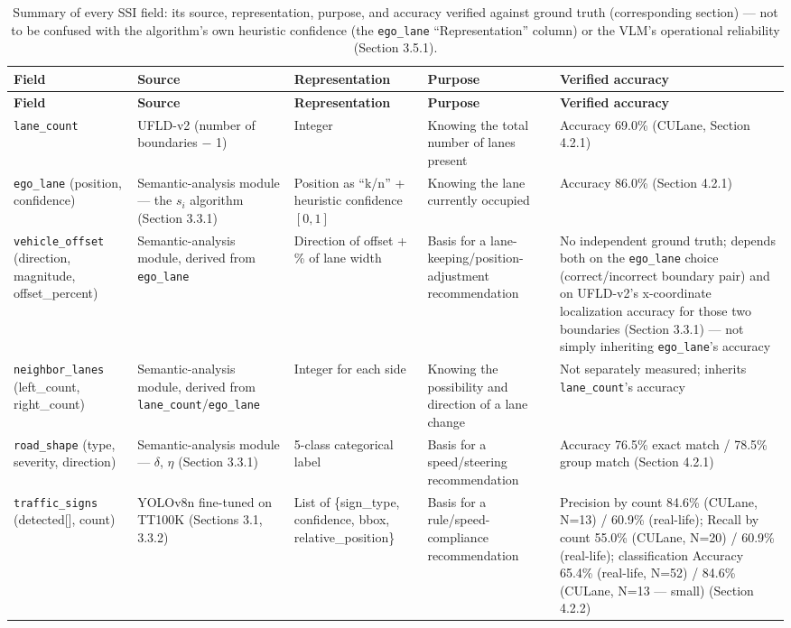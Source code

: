 \documentclass[12pt,a4paper]{report}
\begin{document}
\begin{longtable}{@{}p{2.4cm}p{2.6cm}p{2.8cm}p{2.6cm}p{4.6cm}@{}}
    \caption[Summary of the SSI fields: source, representation, purpose, and verified accuracy]{Summary of every SSI field: its source, representation, purpose, and accuracy verified against ground truth (corresponding section) --- not to be confused with the algorithm's own heuristic confidence (the \texttt{ego\_lane} ``Representation'' column) or the VLM's operational reliability (Section 3.5.1).}
    \label{tab:3.4} \\
    \toprule
    \textbf{Field} & \textbf{Source} & \textbf{Representation} & \textbf{Purpose} & \textbf{Verified accuracy} \\
    \midrule
    \endfirsthead
    \toprule
    \textbf{Field} & \textbf{Source} & \textbf{Representation} & \textbf{Purpose} & \textbf{Verified accuracy} \\
    \midrule
    \endhead
    \texttt{lane\_count} & UFLD-v2 (number of boundaries $-$ 1) & Integer & Knowing the total number of lanes present & Accuracy 69.0\% (CULane, Section 4.2.1) \\
    \texttt{ego\_lane} (position, confidence) & Semantic-analysis module --- the $s_i$ algorithm (Section 3.3.1) & Position as ``k/n'' + heuristic confidence $[0,1]$ & Knowing the lane currently occupied & Accuracy 86.0\% (Section 4.2.1) \\
    \texttt{vehicle\_offset} (direction, magnitude, offset\_percent) & Semantic-analysis module, derived from \texttt{ego\_lane} & Direction of offset + \% of lane width & Basis for a lane-keeping/position-adjustment recommendation & No independent ground truth; depends both on the \texttt{ego\_lane} choice (correct/incorrect boundary pair) and on UFLD-v2's x-coordinate localization accuracy for those two boundaries (Section 3.3.1) --- not simply inheriting \texttt{ego\_lane}'s accuracy \\
    \texttt{neighbor\_lanes} (left\_count, right\_count) & Semantic-analysis module, derived from \texttt{lane\_count}/\texttt{ego\_lane} & Integer for each side & Knowing the possibility and direction of a lane change & Not separately measured; inherits \texttt{lane\_count}'s accuracy \\
    \texttt{road\_shape} (type, severity, direction) & Semantic-analysis module --- $\delta$, $\eta$ (Section 3.3.1) & 5-class categorical label & Basis for a speed/steering recommendation & Accuracy 76.5\% exact match / 78.5\% group match (Section 4.2.1) \\
    \texttt{traffic\_signs} (detected[], count) & YOLOv8n fine-tuned on TT100K (Sections 3.1, 3.3.2) & List of \{sign\_type, confidence, bbox, relative\_position\} & Basis for a rule/speed-compliance recommendation & Precision by count 84.6\% (CULane, N=13) / 60.9\% (real-life); Recall by count 55.0\% (CULane, N=20) / 60.9\% (real-life); classification Accuracy 65.4\% (real-life, N=52) / 84.6\% (CULane, N=13 --- small) (Section 4.2.2) \\
    \bottomrule
\end{longtable}
\end{document}
